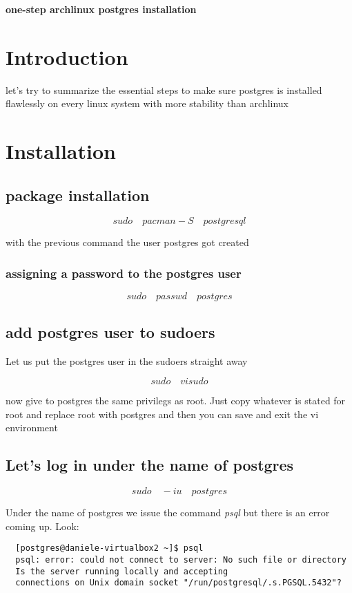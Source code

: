 \documentclass[a4paper,12pt]{article}
\begin{document}
\textbf{one-step archlinux postgres installation}
\tableofcontents

\section{Introduction}

let's try to summarize the essential steps to make sure postgres is installed flawlessly on every linux system with more stability than archlinux


\section{Installation}

\subsection {package installation}
\[sudo \quad pacman -S \quad postgresql \]

with the previous command the user postgres got created

\subsubsection{assigning a password to the postgres user}

\[ sudo \quad passwd \quad postgres \]

\subsection{add postgres user to sudoers}

Let us put the postgres user in the sudoers straight away

\[sudo \quad visudo  \]

now give to postgres the same privilegs as root. Just copy whatever is stated for root and replace root with postgres and then you can save and exit the vi environment


\subsection{Let's log in under the name of postgres}

\[ sudo \quad -iu \quad postgres \]

Under the name of postgres we issue the command \emph{psql} but there is an error coming up. Look:

\begin{lstlisting}
  [postgres@daniele-virtualbox2 ~]$ psql   
  psql: error: could not connect to server: No such file or directory   
  Is the server running locally and accepting   
  connections on Unix domain socket "/run/postgresql/.s.PGSQL.5432"?   
\end{lstlisting}
\end{document}
